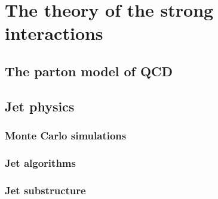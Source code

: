 %
%
\chapter{The theory of the strong interactions}



\section{The parton model of QCD}\label{sec:qcdintro}

\section{Jet physics}\label{sec:jetsintro}

\subsection{Monte Carlo simulations}

\subsection{Jet algorithms}

\subsection{Jet substructure}

